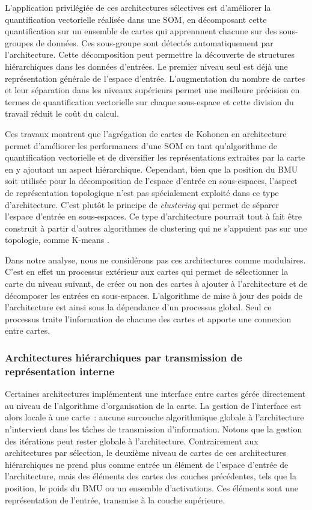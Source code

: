 \documentclass[../main]{subfiles}
\begin{document}
L'application privilégiée de ces architectures sélectives est d'améliorer la quantification vectorielle réalisée dans une SOM, en décomposant cette quantification sur un ensemble de cartes qui apprennnent chacune sur des sous-groupes de données. Ces sous-groupe sont détectés automatiquement par l'architecture.
Cette décomposition peut permettre la découverte de structures hiérarchiques dans les données d'entrées.
Le premier niveau seul est déjà une représentation générale de l'espace d'entrée. L'augmentation du nombre de cartes et leur séparation dans les niveaux supérieurs permet une meilleure précision en termes de quantification vectorielle sur chaque sous-espace et cette division du travail réduit le coût du calcul.

Ces travaux montrent que l'agrégation de cartes de Kohonen en architecture permet d'améliorer les performances d'une SOM en tant qu'algorithme de quantification vectorielle et de diversifier les représentations extraites par la carte en y ajoutant un aspect hiérarchique.
Cependant, bien que la position du BMU soit utilisée pour la décomposition de l'espace d'entrée en sous-espaces, l'aspect de représentation topologique n'est pas spécialement exploité dans ce type d'architecture.
C'est plutôt le principe de \emph{clustering} qui permet de séparer l'espace d'entrée en sous-espaces. Ce type d'architecture pourrait tout à fait être construit à partir d'autres algorithmes de clustering qui ne s'appuient pas sur une topologie, comme K-means \parencite{1094577}.

Dans notre analyse, nous ne considérons pas ces architectures comme modulaires.
C'est en effet un processus extérieur aux cartes qui permet de sélectionner la carte du niveau suivant, de créer ou non des cartes à ajouter à l'architecture et de décomposer les entrées en sous-espaces. 
L'algorithme de mise à jour des poids de l'architecture est ainsi sous la dépendance d'un processus global.
Seul ce processus traite l'information de chacune des cartes et apporte une connexion entre cartes.

\subsubsection{Architectures hiérarchiques par transmission de représentation interne}

Certaines architectures implémentent une interface entre cartes gérée directement au niveau de l'algorithme d'organisation de la carte. La gestion de l'interface est alors locale à une carte~: aucune surcouche algorithmique globale à l'architecture n'intervient dans les tâches de transmission d'information. Notons que la gestion des itérations peut rester globale à l'architecture.
Contrairement aux architectures par sélection, le deuxième niveau de cartes de ces architectures hiérarchiques ne prend plus comme entrée un élément de l'espace d'entrée de l'architecture, mais des éléments des cartes des couches précédentes, tels que la position, le poids du BMU ou un ensemble d'activations.
Ces éléments sont une représentation de l'entrée, transmise à la couche supérieure.
\end{document}
